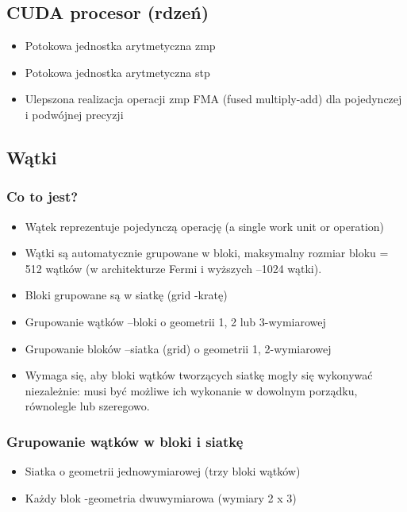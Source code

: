 \documentclass[a4paper,twoside]{article}
\begin{document}
\subsection{CUDA procesor (rdzeń)}
\begin{itemize}
	\item Potokowa jednostka arytmetyczna zmp
	\item Potokowa jednostka arytmetyczna stp
	\item Ulepszona realizacja operacji zmp FMA (fused multiply-add) dla pojedynczej i podwójnej precyzji
\end{itemize}

\subsection{Wątki}
\subsubsection{Co to jest?}
\begin{itemize}
	\item Wątek reprezentuje pojedynczą operację (a single work unit or operation)
	\item Wątki są automatycznie grupowane w bloki, maksymalny rozmiar bloku = 512 wątków (w architekturze Fermi i wyższych –1024 wątki).
	\item Bloki grupowane są w siatkę (grid -kratę)
	\item Grupowanie wątków –bloki o geometrii 1, 2 lub 3-wymiarowej
	\item Grupowanie bloków –siatka (grid) o geometrii 1, 2-wymiarowej
	\item Wymaga się, aby bloki wątków tworzących siatkę mogły się wykonywać niezależnie: musi być możliwe ich wykonanie w dowolnym porządku, równolegle lub szeregowo.
\end{itemize}
\subsubsection{Grupowanie wątków w bloki i siatkę}
\begin{itemize}
	\item Siatka o geometrii jednowymiarowej (trzy bloki wątków)
	\item Każdy blok -geometria dwuwymiarowa (wymiary 2 x 3)
\end{itemize}
\end{document}
